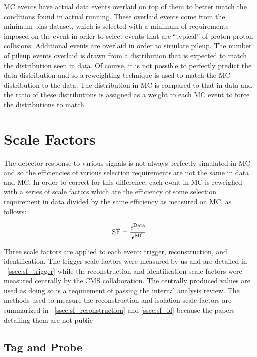 MC events have actual data events overlaid on top of them to better match the
conditions found in actual running. These overlaid events come from the minimum
bias dataset, which is selected with a minimum of requirements imposed on the
event in order to select events that are ``typical'' of proton-proton
collisions. Additional events are overlaid in order to simulate pileup. The
number of pileup events overlaid is drawn from a distribution that is expected
to match the distribution seen in data.  Of course, it is not possible to
perfectly predict the data distribution and so a reweighting technique is used
to match the MC distribution to the data. The distribution in MC is compared to
that in data and the ratio of these distributions is assigned as a weight to
each MC event to force the distributions to match.

\section{Scale Factors}
\label{sec:scale_factors}

The detector response to various signals is not always perfectly simulated in
MC and so the efficiencies of various selection requirements are not the same
in data and MC. In order to correct for this difference, each event in MC is
reweighed with a series of scale factors which are the efficiency of some
selection requirement in data divided by the same efficiency as measured on MC,
as follows:

\begin{equation}
    \label{eq:sf}
    \text{SF} = \frac{\epsilon^{\text{Data}}}{\epsilon^{\text{MC}}}
\end{equation}

Three scale factors are applied to each event: trigger, reconstruction, and
identification. The trigger scale factors were measured by us and are detailed
in \SEC~\ref{ssec:sf_trigger} while the reconstruction and identification scale
factors were measured centrally by the CMS collaboration. The centrally
produced values are used as doing so is a requirement of passing the internal
analysis review. The methods used to measure the reconstruction and isolation
scale factors are summarized in \SECS~\ref{ssec:sf_reconstruction} and
\ref{ssec:sf_id} because the papers detailing them are not public

\subsection{Tag and Probe}


